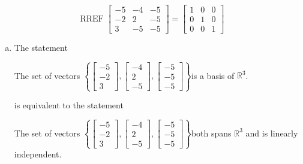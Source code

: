 \begin{exerciseAnswer} 


\[\operatorname{RREF} \left[\begin{array}{ccc}
-5 & -4 & -5 \\
-2 & 2 & -5 \\
3 & -5 & -5
\end{array}\right] = \left[\begin{array}{ccc}
1 & 0 & 0 \\
0 & 1 & 0 \\
0 & 0 & 1
\end{array}\right] \]


\begin{enumerate}[(a)]
\item The statement 
\begin{center}\begin{minipage}{0.8\textwidth}
 The set of vectors \( \left\{ \left[\begin{array}{c}
-5 \\
-2 \\
3
\end{array}\right] , \left[\begin{array}{c}
-4 \\
2 \\
-5
\end{array}\right] , \left[\begin{array}{c}
-5 \\
-5 \\
-5
\end{array}\right] \right\} \)is a basis of \(\mathbb{R}^3\). 
\end{minipage}\end{center}
     is equivalent to the statement 
\begin{center}\begin{minipage}{0.8\textwidth}
 The set of vectors \( \left\{ \left[\begin{array}{c}
-5 \\
-2 \\
3
\end{array}\right] , \left[\begin{array}{c}
-4 \\
2 \\
-5
\end{array}\right] , \left[\begin{array}{c}
-5 \\
-5 \\
-5
\end{array}\right] \right\} \)both spans \(\mathbb{R}^3\) and is linearly independent.
\end{minipage}\end{center}
    

\end{enumerate}
\end{exerciseAnswer}
